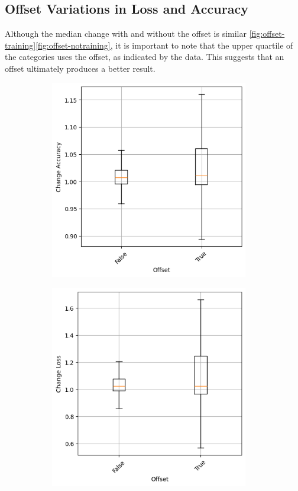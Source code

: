 \subsection{Offset Variations in Loss and Accuracy}\label{subsec:offset-variations-in-loss-and-accuracy}
Although the median change with and without the offset is similar \ref{fig:offset-training}\ref{fig:offset-notraining}, it is important to note that the upper quartile of the categories uses the offset, as indicated by the data.
This suggests that an offset ultimately produces a better result.
\begin{figure}
    \begin{subfigure}{0.5\textwidth}
        \centering
        \includegraphics[width=0.95\textwidth]{plots/Offset_Trained_accuracy.png}
    \end{subfigure}
    \begin{subfigure}{0.5\textwidth}
        \centering
        \includegraphics[width=0.95\textwidth]{plots/Offset_Trained_loss.png}

\end{subfigure}
\end{figure}
